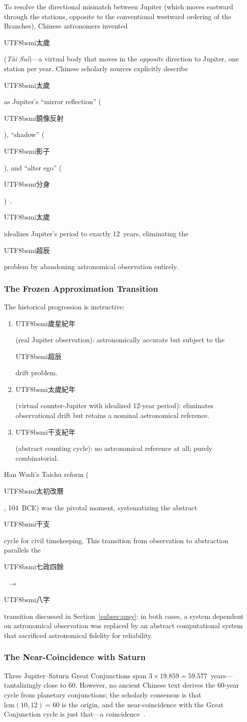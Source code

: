\documentclass[10pt,a4paper]{article}
\newcommand{\zh}[1]{\begin{CJK}{UTF8}{bsmi}#1\end{CJK}}
\begin{document}
To resolve the directional mismatch between Jupiter (which moves
eastward through the stations, opposite to the conventional westward
ordering of the Branches), Chinese astronomers invented \zh{太歲}
(\textit{T\`{a}i Su\`{i}})---a virtual body that moves in the
\emph{opposite} direction to Jupiter, one station per year. Chinese
scholarly sources explicitly describe \zh{太歲} as Jupiter's ``mirror
reflection'' (\zh{鏡像反射}), ``shadow'' (\zh{影子}), and ``alter ego''
(\zh{分身})~\cite{taisui_origin}. \zh{太歲} idealizes Jupiter's period
to exactly 12~years, eliminating the \zh{超辰} problem by abandoning
astronomical observation entirely.

\subsubsection{The Frozen Approximation Transition}

The historical progression is instructive:

\begin{enumerate}[nosep]
  \item \zh{歲星紀年} (real Jupiter observation): astronomically
    accurate but subject to the \zh{超辰} drift problem.
  \item \zh{太歲紀年} (virtual counter-Jupiter with idealized 12-year
    period): eliminates observational drift but retains a nominal
    astronomical reference.
  \item \zh{干支紀年} (abstract counting cycle): no astronomical
    reference at all; purely combinatorial.
\end{enumerate}

\noindent
Han Wudi's Taichu reform (\zh{太初改曆}, 104~BCE) was the pivotal
moment, systematizing the abstract \zh{干支} cycle for civil
timekeeping. This transition from observation to abstraction parallels
the \zh{七政四餘}~$\to$~\zh{八字} transition discussed in
Section~\ref{subsec:qzsy}: in both cases, a system dependent on
astronomical observation was replaced by an abstract computational
system that sacrificed astronomical fidelity for reliability.

\subsubsection{The Near-Coincidence with Saturn}

Three Jupiter--Saturn Great Conjunctions span $3 \times 19.859 =
59.577$~years---tantalizingly close to 60. However, no ancient Chinese
text derives the 60-year cycle from planetary conjunctions; the scholarly
consensus is that $\text{lcm}(10, 12) = 60$ is the origin, and the
near-coincidence with the Great Conjunction cycle is just that---a
coincidence~\cite{needham1959}.
\end{document}
